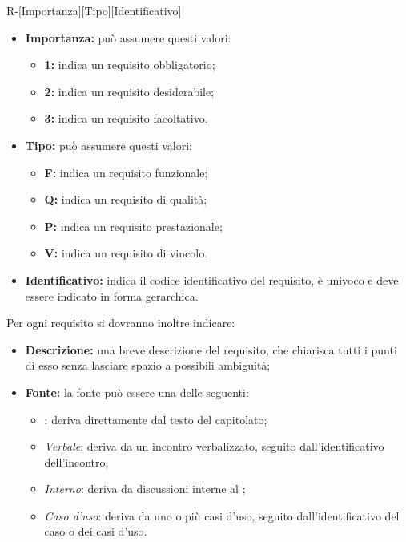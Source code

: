 \begin{center}
R-[Importanza][Tipo][Identificativo]
\end{center}
\begin{itemize}
	\item \textbf{Importanza:} può assumere questi valori:
  		\begin{itemize}
    		\item \textbf{1:} indica un requisito obbligatorio;
    		\item \textbf{2:} indica un requisito desiderabile;
    		\item \textbf{3:} indica un requisito facoltativo.
  		\end{itemize}
  	\item \textbf{Tipo:} può assumere questi valori:
  		\begin{itemize}
   		 	\item \textbf{F:} indica un requisito funzionale;
    		\item \textbf{Q:} indica un requisito di qualità;
    		\item \textbf{P:} indica un requisito prestazionale;
    		\item \textbf{V:} indica un requisito di vincolo.
  		\end{itemize}
  	\item \textbf{Identificativo:} indica il codice identificativo del requisito, è univoco e deve essere indicato in forma gerarchica.
\end{itemize}
Per ogni requisito si dovranno inoltre indicare:
\begin{itemize}
  \item \textbf{Descrizione:} una breve descrizione del requisito, che chiarisca tutti i punti di esso senza lasciare spazio a possibili ambiguità;
  \item \textbf{Fonte:} la fonte può essere una delle seguenti:
  \begin{itemize}
    \item \textit{}: deriva direttamente dal testo del capitolato;
    \item \textit{Verbale}: deriva da un incontro verbalizzato, seguito dall'identificativo dell'incontro;
    \item \textit{Interno}: deriva da discussioni interne al ;
    \item \textit{Caso d'uso}: deriva da uno o più casi d'uso, seguito dall'identificativo del caso o dei casi d'uso.
  \end{itemize}
\end{itemize}

